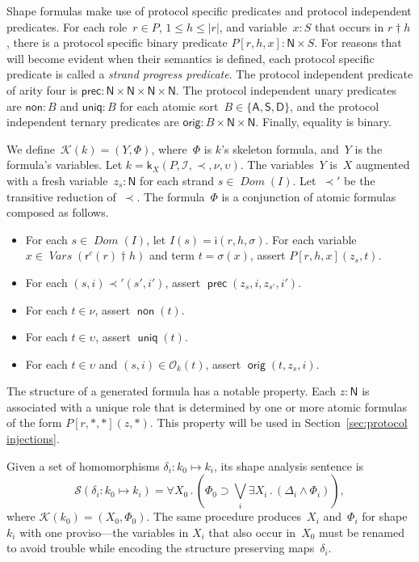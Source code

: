 \documentclass[12pt]{article}
\newcommand{\cn}[1]{\ensuremath{\operatorname{\mathsf{#1}}}}
\newcommand{\fn}[1]{\ensuremath{\operatorname{\mathit{#1}}}}
\newcommand{\srt}[1]{\ensuremath{\mathsf{#1}}}
\newcommand{\typ}{\mathbin:}
\newcommand{\sdom}{\fn{Dom}}
\newcommand{\vars}{\fn{Vars}}
\newcommand{\prefix}[2]{#1\dagger#2}
\newcommand{\all}[1]{\forall#1\mathpunct.}
\newcommand{\some}[1]{\exists#1\mathpunct.}
\newcommand{\form}{\mathcal{K}}
\newcommand{\sent}{\mathcal{S}}
\newcommand{\skel}{\mathsf{k}}
\newcommand{\insta}{\mathsf{i}}
\newcommand{\insts}{\mathcal{I}}
\newcommand{\role}{\mathsf{r}}
\newcommand{\orig}{\mathcal{O}}
\begin{document}
Shape formulas make use of protocol specific predicates and protocol
independent predicates.  For each role~$r\in P$, $1\leq h\leq|r|$, and
variable~$x\typ S$ that occurs in $\prefix{r}{h}$, there is a protocol
specific binary predicate $P[r,h,x]\typ\srt{N}\times S$.  For reasons
that will become evident when their semantics is defined, each
protocol specific predicate is called a \emph{strand progress
  predicate}. The protocol independent predicate of arity four is
$\mathsf{prec}\typ\srt{N}\times\srt{N}\times\srt{N}\times\srt{N}$.
The protocol independent unary predicates are $\mathsf{non}\typ B$ and
$\mathsf{uniq}\typ B$ for each atomic sort~$B\in\{\srt{A},
\srt{S},\srt{D}\}$, and the protocol independent ternary predicates
are $\mathsf{orig}\typ B\times\srt{N}\times\srt{N}$.  Finally,
equality is binary.

We define~$\form(k)=(Y,\Phi)$, where~$\Phi$ is $k$'s skeleton formula,
and~$Y$ is the formula's variables.  Let
$k=\skel_X(P,\insts,\prec,\nu,\upsilon)$.  The variables~$Y$ is~$X$
augmented with a fresh variable~$z_s\typ\srt{N}$ for each strand
$s\in\sdom(I)$.  Let~$\prec'$ be the transitive reduction of~$\prec$.
The formula~$\Phi$ is a conjunction of atomic formulas composed as
follows.

\begin{itemize}
\item For each $s\in\sdom(I)$, let $I(s)=\insta(r,h,\sigma)$.  For
  each variable $x\in\vars(\prefix{\role^c(r)}{h})$ and term
  $t=\sigma(x)$, assert $P[r,h,x](z_s,t)$.
\item For each $(s,i)\prec'(s',i')$, assert
  $\cn{prec}(z_s,i,z_{s'},i')$.
\item For each $t\in\nu$, assert $\cn{non}(t)$.
\item For each $t\in\upsilon$, assert $\cn{uniq}(t)$.
\item For each $t\in\upsilon$ and $(s,i)\in\orig_k(t)$, assert
  $\cn{orig}(t,z_s, i)$.
\end{itemize}

The structure of a generated formula has a notable property.  Each
$z\typ\srt{N}$ is associated with a unique role that is determined by
one or more atomic formulas of the form $P[r,\ast,\ast](z,\ast)$.
This property will be used in Section~\ref{sec:protocol injections}.

Given a set of homomorphisms $\delta_i\typ k_0\mapsto k_i$, its shape
analysis sentence is
\begin{equation}\label{eqn:shape sentence}
\sent(\delta_i\typ k_0\mapsto k_i)=\all{X_0}(\Phi_0\supset
\bigvee_i\some{X_i}(\Delta_i\wedge\Phi_i)),
\end{equation}
where $\form(k_0)=(X_0,\Phi_0)$.  The same procedure produces~$X_i$
and~$\Phi_i$ for shape~$k_i$ with one proviso---the variables in
$X_i$ that also occur in~$X_0$ must be renamed to avoid trouble while
encoding the structure preserving maps~$\delta_i$.
\end{document}
